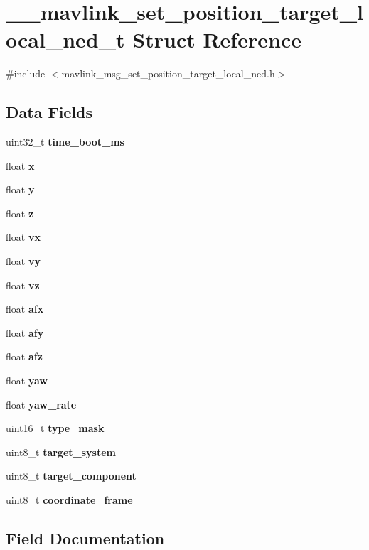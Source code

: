 \section{\+\_\+\+\_\+mavlink\+\_\+set\+\_\+position\+\_\+target\+\_\+local\+\_\+ned\+\_\+t Struct Reference}
\label{struct____mavlink__set__position__target__local__ned__t}


{\ttfamily \#include $<$mavlink\+\_\+msg\+\_\+set\+\_\+position\+\_\+target\+\_\+local\+\_\+ned.\+h$>$}

\subsection*{Data Fields}
\begin{DoxyCompactItemize}
\item 
uint32\+\_\+t \textbf{ time\+\_\+boot\+\_\+ms}
\item 
float \textbf{ x}
\item 
float \textbf{ y}
\item 
float \textbf{ z}
\item 
float \textbf{ vx}
\item 
float \textbf{ vy}
\item 
float \textbf{ vz}
\item 
float \textbf{ afx}
\item 
float \textbf{ afy}
\item 
float \textbf{ afz}
\item 
float \textbf{ yaw}
\item 
float \textbf{ yaw\+\_\+rate}
\item 
uint16\+\_\+t \textbf{ type\+\_\+mask}
\item 
uint8\+\_\+t \textbf{ target\+\_\+system}
\item 
uint8\+\_\+t \textbf{ target\+\_\+component}
\item 
uint8\+\_\+t \textbf{ coordinate\+\_\+frame}
\end{DoxyCompactItemize}


\subsection{Field Documentation}
\mbox{\label{struct____mavlink__set__position__target__local__ned__t_a7db44bb9672bc444e2aeab70335bb864}} 
